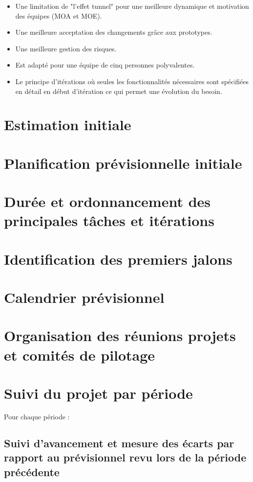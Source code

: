 \documentclass[11pt,a4paper,titlepage,openright]{report}
\begin{document}
    \begin{itemize}
        \item Une limitation de "l'effet tunnel" pour une meilleure dynamique et motivation des équipes (MOA et MOE).
        \item Une meilleure acceptation des changements grâce aux prototypes.
        \item Une meilleure gestion des risques.
        \item Est adapté pour une équipe de cinq personnes polyvalentes.
        \item Le principe d'itérations où seules les fonctionnalités nécessaires sont spécifiées en détail en début d'itération ce qui permet une évolution du besoin.
    \end{itemize}

    \section{Estimation initiale}
    \section{Planification prévisionnelle initiale}
    \section{Durée et ordonnancement des principales tâches et itérations}
    \section{Identification des premiers jalons}
    \section{Calendrier prévisionnel}
    \section{Organisation des réunions projets et comités de pilotage}
    \section{Suivi du projet par période}
    Pour chaque période :
    \subsection{Suivi d’avancement et mesure des écarts par rapport au prévisionnel revu lors de la période précédente}
\end{document}
